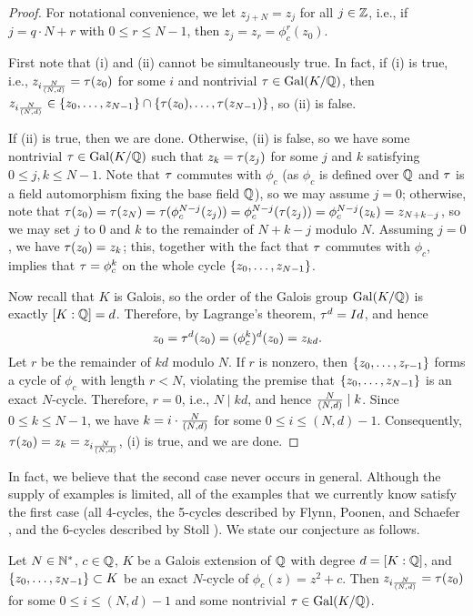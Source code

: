 \begin{proof}
  For notational convenience, we let $z_{j+N} = z_j$ for all $j \in
  \mathbb{Z}$, i.e., if $j = q \cdot N + r$ with $0 \le r \le N-1$, then $z_j
  = z_r = \phi_c^r(z_0)$.

  First note that (i) and (ii) cannot be simultaneously true. In fact,
  if (i) is true, i.e., $z_{i\frac{N}{(N, d)}} = \tau(z_0)$ for some $i$ and
  nontrivial $\tau \in \mathrm{Gal}(K/\mathbb{Q})$, then $z_{i\frac{N}{(N, d)}} \in \left\{z_0, \dots,
    z_{N-1}\right\} \cap \left\{\tau(z_0), \dots, \tau(z_{N-1})\right\}$, so (ii) is
  false.

  If (ii) is true, then we are done. Otherwise, (ii) is false, so we
  have some nontrivial $\tau \in \mathrm{Gal}(K/\mathbb{Q})$ such that $z_k = \tau(z_j)$
  for some $j$ and $k$ satisfying $0 \le j, k \le N-1$. Note that $\tau$
  commutes with $\phi_c$ (as $\phi_c$ is defined over $\mathbb{Q}$ and $\tau$ is
  a field automorphism fixing the base field $\mathbb{Q}$), so we may assume
  $j = 0$; otherwise, note that $\tau(z_0) = \tau(z_N) =
  \tau(\phi_c^{N-j}(z_j)) = \phi_c^{N-j}(\tau(z_j)) = \phi_c^{N-j}(z_k) =
  z_{N+k-j}$, so we may set $j$ to 0 and $k$ to the remainder of
  $N+k-j$ modulo $N$. Assuming $j = 0$, we have $\tau(z_0) = z_k$; this,
  together with the fact that $\tau$ commutes with $\phi_c$, implies
  that $\tau = \phi_c^k$ on the whole cycle $\left\{z_0, \dots, z_{N-1}\right\}$.

  Now recall that $K$ is Galois, so the order of the Galois group
  $\mathrm{Gal}(K/\mathbb{Q})$ is exactly $[K : \mathbb{Q}] = d$. Therefore, by Lagrange's
  theorem, $\tau^d = Id$, and hence
  \[
  z_0 = \tau^d(z_0) = (\phi_c^k)^d(z_0) = z_{kd}.
  \]
  Let $r$ be the remainder of $kd$ modulo $N$. If $r$ is nonzero, then
  $\left\{z_0, \dots, z_{r-1}\right\}$ forms a cycle of $\phi_c$ with length $r
  < N$, violating the premise that $\left\{z_0, \dots, z_{N-1}\right\}$ is an
  exact $N$-cycle. Therefore, $r = 0$, i.e., $N \mid kd$, and hence
  $\frac{N}{(N, d)} \mid k$. Since $0 \le k \le N - 1$, we have $k = i \cdot \frac{N}{(N, d)}$
  for some $0 \le i \le (N, d) - 1$. Consequently, $\tau(z_0) = z_k =
  z_{i\frac{N}{(N, d)}}$, (i) is true, and we are done.
\end{proof}

In fact, we believe that the second case never occurs in
general. Although the supply of examples is limited, all of the
examples that we currently know satisfy the first case (all 4-cycles,
the 5-cycles described by Flynn, Poonen, and Schaefer
\cite{MR1480542}, and the 6-cycles described by Stoll
\cite{MR2465796}). We state our conjecture as follows.

\begin{conjecture}
  \label{cj:galois-conjugate}
  Let $N \in \mathbb{N}^*$, $c \in \mathbb{Q}$, $K$ be a Galois extension of $\mathbb{Q}$ with
  degree $d = [K : \mathbb{Q}]$, and $\left\{z_0, \dots, z_{N-1}\right\} \subset K$ be
  an exact $N$-cycle of $\phi_c(z) = z^2 + c$. Then $z_{i\frac{N}{(N, d)}} =
  \tau(z_0)$ for some $0 \le i \le (N, d)-1$ and some nontrivial $\tau \in
  \mathrm{Gal}(K/\mathbb{Q})$.
\end{conjecture}

